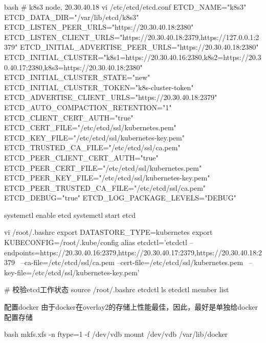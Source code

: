 \begin{outline}[enumerate]
\begin{code-in-enumerate}{bash}
# k8s3 node, 20.30.40.18
vi /etc/etcd/etcd.conf
ETCD_NAME="k8s3"
ETCD_DATA_DIR="/var/lib/etcd/k8s3"
ETCD_LISTEN_PEER_URLS="https://20.30.40.18:2380"
ETCD_LISTEN_CLIENT_URLS="https://20.30.40.18:2379,https://127.0.0.1:2379"
ETCD_INITIAL_ADVERTISE_PEER_URLS="https://20.30.40.18:2380"
ETCD_INITIAL_CLUSTER="k8s1=https://20.30.40.16:2380,k8s2=https://20.30.40.17:2380,k8s3=https://20.30.40.18:2380"
ETCD_INITIAL_CLUSTER_STATE="new"
ETCD_INITIAL_CLUSTER_TOKEN="k8s-cluster-token"
ETCD_ADVERTISE_CLIENT_URLS="https://20.30.40.18:2379"
ETCD_AUTO_COMPACTION_RETENTION="1"
ETCD_CLIENT_CERT_AUTH="true"
ETCD_CERT_FILE="/etc/etcd/ssl/kubernetes.pem"
ETCD_KEY_FILE="/etc/etcd/ssl/kubernetes-key.pem"
ETCD_TRUSTED_CA_FILE="/etc/etcd/ssl/ca.pem"
ETCD_PEER_CLIENT_CERT_AUTH="true"
ETCD_PEER_CERT_FILE="/etc/etcd/ssl/kubernetes.pem"
ETCD_PEER_KEY_FILE="/etc/etcd/ssl/kubernetes-key.pem"
ETCD_PEER_TRUSTED_CA_FILE="/etc/etcd/ssl/ca.pem"
ETCD_DEBUG="true"
ETCD_LOG_PACKAGE_LEVELS="DEBUG"

systemctl enable etcd
systemctl start etcd

vi /root/.bashrc
export DATASTORE_TYPE=kubernetes
export KUBECONFIG=/root/.kube/config
alias etcdctl='etcdctl --endpoints=https://20.30.40.16:2379,https://20.30.40.17:2379,https://20.30.40.18:2379 \
    --ca-file=/etc/etcd/ssl/ca.pem --cert-file=/etc/etcd/ssl/kubernetes.pem  \
    --key-file=/etc/etcd/ssl/kubernetes-key.pem'

# 校验etcd工作状态
source /root/.bashrc
etcdctl ls
etcdctl member list
\end{code-in-enumerate}

  \1 配置docker
由于docker在overlay2的存储上性能最佳，因此，最好是单独给docker配置存储
\begin{code-in-enumerate}{bash}
mkfs.xfs -n ftype=1 -f /dev/vdb
mount /dev/vdb /var/lib/docker


\end{code-in-enumerate}
\end{outline}
